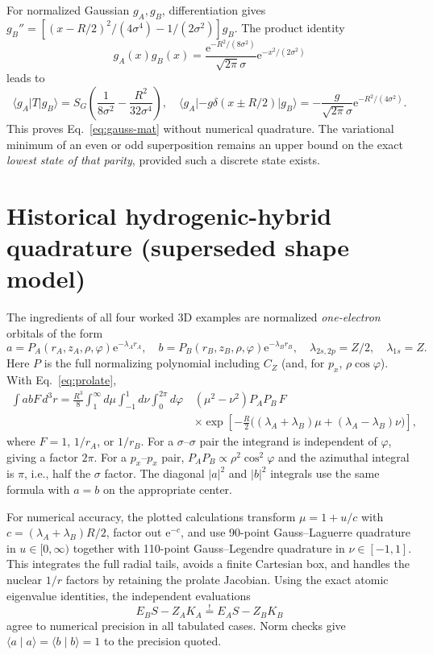 \documentclass[11pt,letterpaper]{article}
\newcommand{\braket}[2]{\langle #1\mid #2\rangle}
\newcommand{\mel}[3]{\langle #1\lvert #2\rvert #3\rangle}
\newcommand{\e}{\mathrm e}
\begin{document}
For normalized Gaussian $g_A,g_B$, differentiation gives $g_B''=[(x-R/2)^2/(4\sigma^4)-1/(2\sigma^2)]g_B$. The product identity
\begin{equation}
g_A(x)g_B(x)=\frac{\e^{-R^2/(8\sigma^2)}}{\sqrt{2\pi}\sigma}\e^{-x^2/(2\sigma^2)}
\end{equation}
leads to
\begin{equation}
\mel{g_A}{T}{g_B}=S_G\left(\frac1{8\sigma^2}-\frac{R^2}{32\sigma^4}\right),\quad
\mel{g_A}{-g\delta(x\pm R/2)}{g_B}=-\frac g{\sqrt{2\pi}\sigma}\e^{-R^2/(4\sigma^2)}.
\end{equation}
This proves Eq.~\eqref{eq:gauss-mat} without numerical quadrature. The variational minimum of an even or odd superposition remains an upper bound on the exact \emph{lowest state of that parity}, provided such a discrete state exists.

\section{Historical hydrogenic-hybrid quadrature (superseded shape model)}\label{app:prolate}
The ingredients of all four worked 3D examples are normalized \emph{one-electron} orbitals of the form
\begin{equation}
a=P_A(r_A,z_A,\rho,\varphi)\e^{-\lambda_A r_A},\quad
b=P_B(r_B,z_B,\rho,\varphi)\e^{-\lambda_B r_B},\quad
\lambda_{2s,2p}=Z/2,\quad\lambda_{1s}=Z.
\end{equation}
Here $P$ is the full normalizing polynomial including $C_Z$ (and, for $p_x$, $\rho\cos\varphi$). With Eq.~\eqref{eq:prolate},
\begin{equation}\label{eq:general-prolate}
\begin{split}
\int abF\,d^3r={\frac{R^3}{8}}\int_1^\infty d\mu\int_{-1}^1d\nu\int_0^{2\pi}d\varphi\,&(\mu^2-\nu^2)P_AP_B\,F\\[-2pt]
&\times\exp\left[-\tfrac R2\big((\lambda_A+\lambda_B)\mu+(\lambda_A-\lambda_B)\nu\big)\right],
\end{split}
\end{equation}
where $F=1$, $1/r_A$, or $1/r_B$. For a $\sigma$--$\sigma$ pair the integrand is independent of $\varphi$, giving a factor $2\pi$. For a $p_x$--$p_x$ pair, $P_AP_B\propto\rho^2\cos^2\varphi$ and the azimuthal integral is $\pi$, i.e., half the $\sigma$ factor. The diagonal $|a|^2$ and $|b|^2$ integrals use the same formula with $a=b$ on the appropriate center.

For numerical accuracy, the plotted calculations transform $\mu=1+u/c$ with $c=(\lambda_A+\lambda_B)R/2$, factor out $\e^{-c}$, and use 90-point Gauss--Laguerre quadrature in $u\in[0,\infty)$ together with 110-point Gauss--Legendre quadrature in $\nu\in[-1,1]$. This integrates the full radial tails, avoids a finite Cartesian box, and handles the nuclear $1/r$ factors by retaining the prolate Jacobian. Using the exact atomic eigenvalue identities, the independent evaluations
\begin{equation}
E_BS-Z_AK_A\stackrel{!}{=}E_AS-Z_BK_B
\end{equation}
agree to numerical precision in all tabulated cases. Norm checks give $\braket aa=\braket bb=1$ to the precision quoted.
\end{document}
